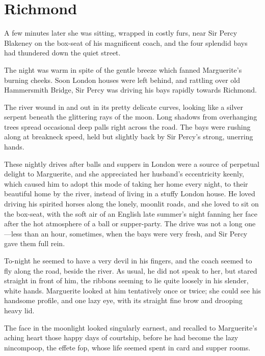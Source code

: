 
\chapter{Richmond}
\lettrine[lines=4]{A}{} few minutes later she was sitting, wrapped in costly furs, near Sir Percy Blakeney on the box-seat of his magnificent coach, and the four splendid bays had thundered down the quiet street.

The night was warm in spite of the gentle breeze which fanned Marguerite's burning cheeks. Soon London houses were left behind, and rattling over old Hammersmith  Bridge, Sir Percy was driving his bays rapidly towards Richmond.

The river wound in and out in its pretty delicate curves, looking like a silver serpent beneath the glittering rays of the moon. Long shadows from overhanging trees spread occasional deep palls right across the road. The bays were rushing along at breakneck speed, held but slightly back by Sir Percy's strong, unerring hands.

These nightly drives after balls and suppers in London were a source of perpetual delight to Marguerite, and she appreciated her husband's eccentricity keenly, which caused him to adopt this mode of taking her home every night, to their beautiful home by the river, instead of living in a stuffy London house. He loved driving his spirited horses along the lonely, moonlit roads, and she loved to sit on the box-seat, with the soft air of an English late summer's night fanning her face after the hot atmosphere of a ball or supper-party. The drive was not a long one\allowbreak---\allowbreak less than an hour, sometimes, when the bays were very fresh, and Sir Percy gave them full rein.

To-night he seemed to have a very devil in his fingers, and the coach seemed to fly along the road, beside the river. As usual, he did not speak to her, but stared straight in front of him, the ribbons seeming to lie quite loosely in his slender, white hands. Marguerite looked at him tentatively once or twice; she could see his handsome profile, and one lazy eye, with its straight fine brow and drooping heavy lid.

The face in the moonlight looked singularly earnest, and recalled to Marguerite's aching heart those happy days of courtship, before he had become the lazy nincompoop, the effete fop, whose life seemed spent in card and supper rooms.

